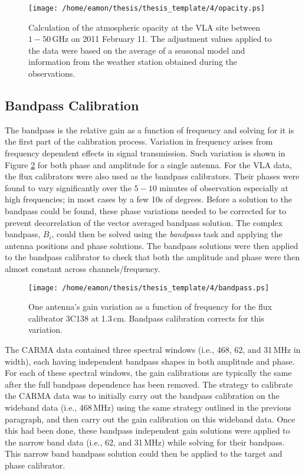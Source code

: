 \begin{figure}[hbt!]
\centering 
\texttt{[image: /home/eamon/thesis/thesis\_template/4/opacity.ps]}  
\caption[Atmospheric opacity at the VLA site.]{Calculation of the atmospheric opacity at the VLA site between $1-50$\,GHz on 2011 February 11. The adjustment values applied to the data were based on the average of a seasonal model and information from the weather station obtained during the observations.}
\label{fig:4.5}
\end{figure}

\subsection{Bandpass Calibration}
The bandpass is the relative gain as a function of frequency and solving for it is the first part of the calibration process. Variation in frequency arises from frequency dependent effects in signal transmission. Such variation is shown in Figure \ref{fig:4.6} for both phase and amplitude for a single antenna. For the VLA data, the flux calibrators were also used as the bandpass calibrators. Their phases were found to vary significantly over the $5-10$ minutes of observation especially at high frequencies; in most cases by a few 10s of degrees. Before a solution to the bandpass could be found, these phase variations needed to be corrected for to prevent decorrelation of the vector averaged bandpass solution. The complex bandpass, $B_i$, could then be solved using the \textit{bandpass} task and applying the antenna positions and phase solutions. The bandpass solutions  were then applied to the bandpass calibrator to check that both the amplitude and phase were then almost constant across channels/frequency.

\begin{figure}[hbt!]
\centering 
\texttt{[image: /home/eamon/thesis/thesis\_template/4/bandpass.ps]}  
\caption[Gain variation as a function of frequency.]{One antenna's gain variation as a function of frequency for the flux calibrator 3C138 at 1.3\,cm. Bandpass calibration corrects for this variation.}
\label{fig:4.6}
\end{figure}

The CARMA data contained three spectral windows (i.e., 468, 62, and 31\,MHz in width), each having independent bandpass shapes in both amplitude and phase. For each of these spectral windows, the gain calibrations are typically the same  after the full bandpass dependence has been removed. The strategy to calibrate the CARMA data was to initially carry out the bandpass calibration on the wideband data (i.e., 468\,MHz) using the same strategy outlined in the previous paragraph, and then carry out the gain calibration on this wideband data. Once this had been done, these bandpass independent gain solutions were applied to the narrow band data (i.e., 62, and 31\,MHz) while solving for their bandpass. This narrow band bandpass solution could then be applied to the target and phase calibrator.

